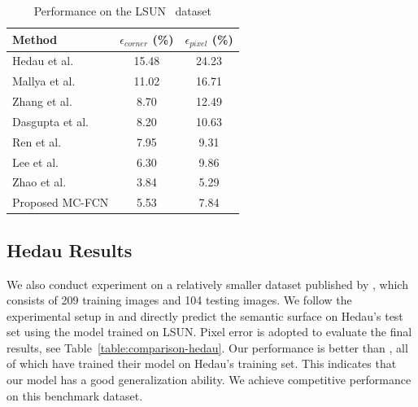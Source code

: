 \begin{table}
	\centering 
	\begin{tabular}{lcc}
		\toprule
		Method & $\epsilon_{corner}$ (\%) & $\epsilon_{pixel}$ (\%) \\
		\midrule
		Hedau et al.~\cite{hedau2009recovering} & 15.48 & 24.23 \\
		Mallya et al.~\cite{mallya2015learning} & 11.02 & 16.71 \\
		Zhang et al.~\cite{zhang2017learning} & 8.70 & 12.49 \\
		Dasgupta et al.~\cite{dasgupta2016delay} & 8.20 & 10.63 \\
		Ren et al.~\cite{ren2016coarse} & 7.95 & 9.31 \\
		Lee et al.~\cite{LeeRoomNet17} & 6.30 & 9.86 \\
		Zhao et al.~\cite{zhao2017physics} & 3.84 & 5.29 \\
		\midrule
		Proposed MC-FCN & 5.53 & 7.84 \\
		\bottomrule
	\end{tabular}
	\caption{Performance on the LSUN~\cite{zhang2015large} dataset}	
	\label{table:comparison-lsun}
\end{table}

\subsection{Hedau Results}
\label{sec:Hedau}
We also conduct experiment on a relatively smaller dataset published by \cite{hedau2009recovering}, which consists of 209 training images and 104 testing images. We follow the experimental setup in \cite{LeeRoomNet17} and directly predict the semantic surface on Hedau's test set using the model trained on LSUN. Pixel error is adopted to evaluate the final results, see Table~\ref{table:comparison-hedau}. Our performance is better than \cite{mallya2015learning,zhang2017learning,ren2016coarse}, all of which have trained their model on Hedau's training set. This indicates that our model has a good generalization ability. We achieve competitive performance on this benchmark dataset.

